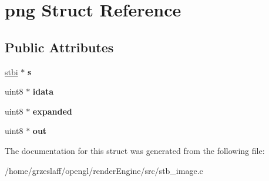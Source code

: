 \hypertarget{structpng}{\section{png Struct Reference}
\label{structpng}
}
\subsection*{Public Attributes}
\begin{DoxyCompactItemize}
\item 
\hypertarget{structpng_a77d3bfd0ae8f598a475317ed39e78fd0}{\hyperlink{structstbi}{stbi} $\ast$ {\bfseries s}}\label{structpng_a77d3bfd0ae8f598a475317ed39e78fd0}

\item 
\hypertarget{structpng_a5cd944fdf0f0417a344bcc538ed98ed6}{uint8 $\ast$ {\bfseries idata}}\label{structpng_a5cd944fdf0f0417a344bcc538ed98ed6}

\item 
\hypertarget{structpng_a474dd0da8ac0347924e68f5de7e68c55}{uint8 $\ast$ {\bfseries expanded}}\label{structpng_a474dd0da8ac0347924e68f5de7e68c55}

\item 
\hypertarget{structpng_ada33c39620ad9a647c088c40d21887f6}{uint8 $\ast$ {\bfseries out}}\label{structpng_ada33c39620ad9a647c088c40d21887f6}

\end{DoxyCompactItemize}


The documentation for this struct was generated from the following file\-:\begin{DoxyCompactItemize}
\item 
/home/grzeslaff/opengl/render\-Engine/src/stb\-\_\-image.\-c\end{DoxyCompactItemize}
